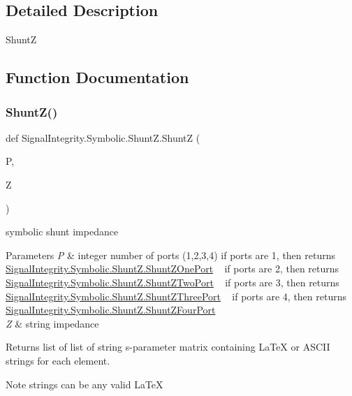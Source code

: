 \subsection{Detailed Description}
\begin{DoxyVerb}ShuntZ\end{DoxyVerb}
 

\subsection{Function Documentation}
\mbox{\label{namespaceSignalIntegrity_1_1Symbolic_1_1ShuntZ_ab32ac03d15bb51423a95fdfaefb764f5}} 
\subsubsection{\texorpdfstring{Shunt\+Z()}{ShuntZ()}}
{\footnotesize\ttfamily def Signal\+Integrity.\+Symbolic.\+Shunt\+Z.\+ShuntZ (\begin{DoxyParamCaption}\item[{}]{P,  }\item[{}]{Z }\end{DoxyParamCaption})}



symbolic shunt impedance 


\begin{DoxyParams}{Parameters}
{\em P} & integer number of ports (1,2,3,4) if ports are 1, then returns \hyperlink{namespaceSignalIntegrity_1_1Symbolic_1_1ShuntZ_abfb38e200fbf919b34ba4e0d78fee0da}{Signal\+Integrity.\+Symbolic.\+Shunt\+Z.\+Shunt\+Z\+One\+Port} ~\newline
 if ports are 2, then returns \hyperlink{namespaceSignalIntegrity_1_1Symbolic_1_1ShuntZ_af01ac02bd83d6d68a7e06134f2a2f4c5}{Signal\+Integrity.\+Symbolic.\+Shunt\+Z.\+Shunt\+Z\+Two\+Port} ~\newline
 if ports are 3, then returns \hyperlink{namespaceSignalIntegrity_1_1Symbolic_1_1ShuntZ_a58498d6d446784d31ce6915a18059b2b}{Signal\+Integrity.\+Symbolic.\+Shunt\+Z.\+Shunt\+Z\+Three\+Port} ~\newline
 if ports are 4, then returns \hyperlink{namespaceSignalIntegrity_1_1Symbolic_1_1ShuntZ_a0516bd7ba5f76dc0247fd30f6aacdffc}{Signal\+Integrity.\+Symbolic.\+Shunt\+Z.\+Shunt\+Z\+Four\+Port} ~\newline
 \\
\hline
{\em Z} & string impedance \\
\hline
\end{DoxyParams}
\begin{DoxyReturn}{Returns}
list of list of string s-\/parameter matrix containing La\+TeX or A\+S\+C\+II strings for each element. 
\end{DoxyReturn}
\begin{DoxyNote}{Note}
strings can be any valid La\+TeX 
\end{DoxyNote}


